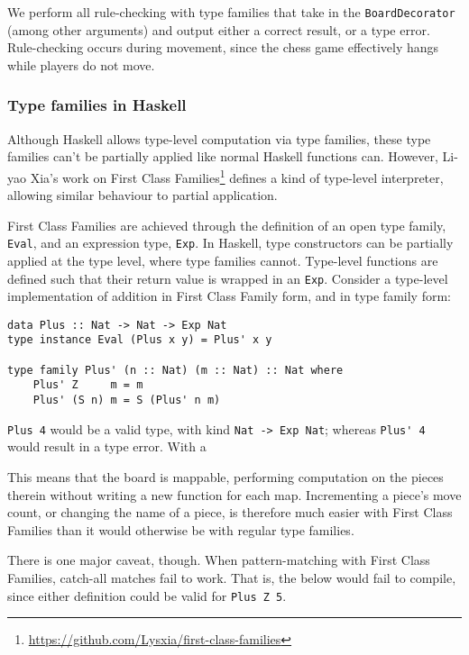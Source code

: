 \documentclass[12pt, a4paper, bibliography=totocnumbered]{scrartcl}
\begin{document}
We perform all rule-checking with type families that take in the \lstinline{BoardDecorator} (among other arguments) and output either a correct result, or a type error. Rule-checking occurs during movement, since the chess game effectively hangs while players do not move.

\subsubsection{Type families in Haskell}

Although Haskell allows type-level computation via type families, these type families can't be partially applied like normal Haskell functions can. However, Li-yao Xia's work on First Class Families\footnote{\url{https://github.com/Lysxia/first-class-families}} defines a kind of type-level interpreter, allowing similar behaviour to partial application.

First Class Families are achieved through the definition of an open type family, \lstinline{Eval}, and an expression type, \lstinline{Exp}. In Haskell, type constructors can be partially applied at the type level, where type families cannot. Type-level functions are defined such that their return value is wrapped in an \lstinline{Exp}. Consider a type-level implementation of addition in First Class Family form, and in type family form:

\begin{lstlisting}
data Plus :: Nat -> Nat -> Exp Nat
type instance Eval (Plus x y) = Plus' x y

type family Plus' (n :: Nat) (m :: Nat) :: Nat where
    Plus' Z     m = m
    Plus' (S n) m = S (Plus' n m)
\end{lstlisting}

\lstinline{Plus 4} would be a valid type, with kind \lstinline{Nat -> Exp Nat}; whereas \lstinline{Plus' 4} would result in a type error. With a 

This means that the board is mappable, performing computation on the pieces therein without writing a new function for each map. Incrementing a piece's move count, or changing the name of a piece, is therefore much easier with First Class Families than it would otherwise be with regular type families.

There is one major caveat, though. When pattern-matching with First Class Families, catch-all matches fail to work. That is, the below would fail to compile, since either definition could be valid for \lstinline{Plus Z 5}.
\end{document}
